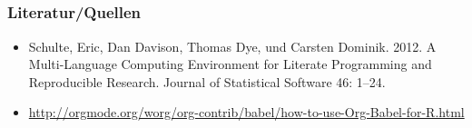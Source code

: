 \documentclass[bigger]{beamer}
\begin{document}
\subsection{}
\begin{frame}
\frametitle{Literatur/Quellen}
\label{sec-5-1-1}


\begin{itemize}
\item Schulte, Eric, Dan Davison, Thomas Dye, und Carsten Dominik. 2012. A
  Multi-Language Computing Environment for Literate Programming and Reproducible
  Research. Journal of Statistical Software 46: 1–24.
\item \href{http://orgmode.org/worg/org-contrib/babel/how-to-use-Org-Babel-for-R.html}{http://orgmode.org/worg/org-contrib/babel/how-to-use-Org-Babel-for-R.html}
\end{itemize}
\end{frame}
\end{document}
